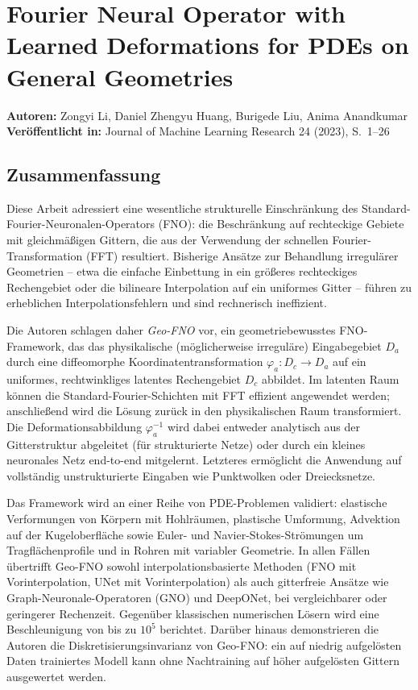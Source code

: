 \documentclass[a4paper,12pt]{article}
\begin{document}
\section*{Fourier Neural Operator with Learned Deformations for PDEs on General Geometries}
\textbf{Autoren:} Zongyi Li, Daniel Zhengyu Huang, Burigede Liu, Anima Anandkumar \\
\textbf{Veröffentlicht in:} Journal of Machine Learning Research 24 (2023), S.~1--26

\subsection*{Zusammenfassung}

Diese Arbeit adressiert eine wesentliche strukturelle Einschränkung des Standard-Fourier-Neuronalen-Operators (FNO): die Beschränkung auf rechteckige Gebiete mit gleichmäßigen Gittern, die aus der Verwendung der schnellen Fourier-Transformation (FFT) resultiert. Bisherige Ansätze zur Behandlung irregulärer Geometrien -- etwa die einfache Einbettung in ein größeres rechteckiges Rechengebiet oder die bilineare Interpolation auf ein uniformes Gitter -- führen zu erheblichen Interpolationsfehlern und sind rechnerisch ineffizient.

Die Autoren schlagen daher \emph{Geo-FNO} vor, ein geometriebewusstes FNO-Framework, das das physikalische (möglicherweise irreguläre) Eingabegebiet $D_a$ durch eine diffeomorphe Koordinatentransformation $\varphi_a: D_c \to D_a$ auf ein uniformes, rechtwinkliges latentes Rechengebiet $D_c$ abbildet. Im latenten Raum können die Standard-Fourier-Schichten mit FFT effizient angewendet werden; anschließend wird die Lösung zurück in den physikalischen Raum transformiert. Die Deformationsabbildung $\varphi_a^{-1}$ wird dabei entweder analytisch aus der Gitterstruktur abgeleitet (für strukturierte Netze) oder durch ein kleines neuronales Netz end-to-end mitgelernt. Letzteres ermöglicht die Anwendung auf vollständig unstrukturierte Eingaben wie Punktwolken oder Dreiecksnetze.

Das Framework wird an einer Reihe von PDE-Problemen validiert: elastische Verformungen von Körpern mit Hohlräumen, plastische Umformung, Advektion auf der Kugeloberfläche sowie Euler- und Navier-Stokes-Strömungen um Tragflächenprofile und in Rohren mit variabler Geometrie. In allen Fällen übertrifft Geo-FNO sowohl interpolationsbasierte Methoden (FNO mit Vorinterpolation, UNet mit Vorinterpolation) als auch gitterfreie Ansätze wie Graph-Neuronale-Operatoren (GNO) und DeepONet, bei vergleichbarer oder geringerer Rechenzeit. Gegenüber klassischen numerischen Lösern wird eine Beschleunigung von bis zu $10^5$ berichtet. Darüber hinaus demonstrieren die Autoren die Diskretisierungsinvarianz von Geo-FNO: ein auf niedrig aufgelösten Daten trainiertes Modell kann ohne Nachtraining auf höher aufgelösten Gittern ausgewertet werden.
\end{document}
